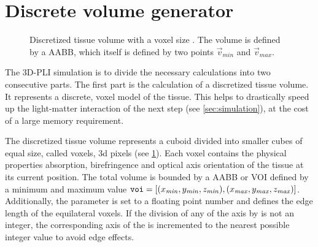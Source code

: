 \section{Discrete volume generator}
\label{sec:dv_generator}
%
\begin{figure}[!t]
\centering
\setlength{\tikzwidth}{0.5\textwidth}
\caption{Discretized tissue volume with a voxel size \voxelsize. The volume is defined by a \ac{AABB}, which itself is defined by two points $\vec{v}_\mathit{min}$ and $\vec{v}_\mathit{max}$.}
\label{fig:discVol}
\end{figure}
%
The \ac{3D-PLI} simulation is to divide the necessary calculations into two consecutive parts. The first part is the calculation of a discretized tissue volume.
It represents a discrete, voxel model of the tissue.
This helps to drastically speed up the light-matter interaction of the next step (see \cref{sec:simulation}), at the cost of a large memory requirement.
\par
%
The discretized tissue volume represents a cuboid divided into smaller cubes of equal size, called voxels, \ie{} 3d pixels (see \cref{fig:discVol}).
Each voxel contains the physical properties absorption, birefringence and optical axis orientation of the tissue at its current position.
The total volume is bounded by a \ac{AABB} or \ac{VOI} defined by a minimum and maximum value $\texttt{voi} = [(x_{\mathit{min}}, y_{\mathit{min}}, z_{\mathit{min}}), (x_{\mathit{max}}, y_{\mathit{max}}, z_{\mathit{max}})]$.
Additionally, the parameter \Voxelsize{} \voxelsize{} is set to a floating point number and defines the edge length of the equilateral voxels.
If the division of any of the \voi{} axis by \voxelsize{} is not an integer, the corresponding axis of the \voi{} is incremented to the nearest possible integer value to avoid edge effects.
%
%
%
